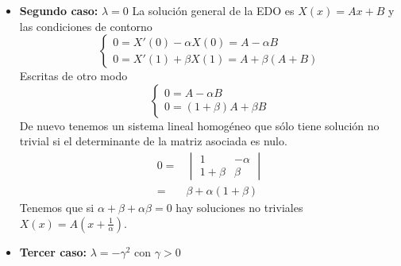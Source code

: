 \begin{itemize}
\item \textbf{Segundo caso:} $\lambda=0$
La solución general de la EDO es $X(x) = Ax+B$ y las condiciones de contorno
\begin{equation*}
\left\{
\begin{array}{l}
0=X'(0) -\alpha X(0)=A-\alpha B\\
0=X'(1)+\beta X(1) = A+\beta(A+B)
\end{array}
\right.
\end{equation*}
Escritas de otro modo
\begin{equation*}
\left\{
\begin{array}{l}
0=A-\alpha B\\
0=(1+\beta)A+\beta B
\end{array}
\right.
\end{equation*}
De nuevo tenemos un sistema lineal homogéneo que sólo tiene solución no trivial si el determinante de la matriz asociada es nulo.
\begin{align*}
0=&\begin{vmatrix}1 & -\alpha \\ 1+\beta & \beta \end{vmatrix}\\
 = & \beta+\alpha(1+\beta)
\end{align*}
Tenemos que si $\alpha+\beta+\alpha\beta = 0$ hay soluciones no triviales $X(x)=A(x+\frac{1}{\alpha})$.
\item \textbf{Tercer caso:} $\lambda=-\gamma^2$ con $\gamma > 0$


\end{itemize}
